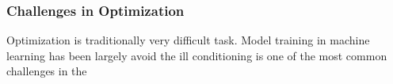 \subsubsection{Challenges in Optimization}

Optimization is traditionally very difficult task. Model training in machine learning has been largely avoid
the ill conditioning is one of the most common challenges in the 